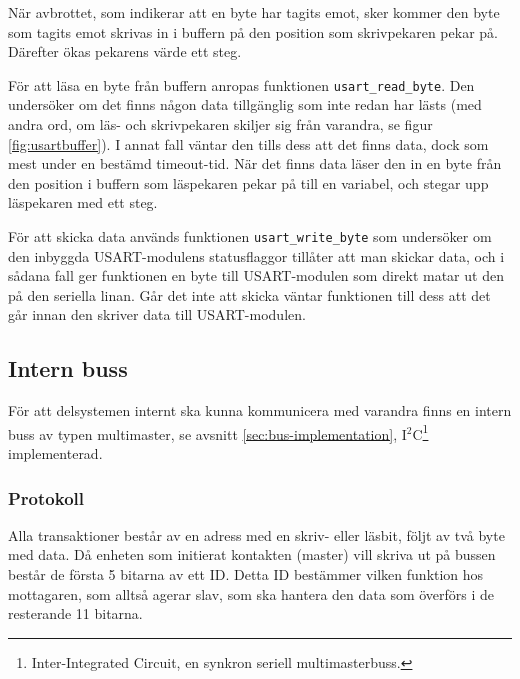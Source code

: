 När avbrottet, som indikerar att en byte har tagits emot, sker kommer den byte som tagits emot skrivas in i buffern på den position som skrivpekaren pekar på. Därefter ökas pekarens värde ett steg.


För att läsa en byte från buffern anropas funktionen \verb|usart_read_byte|. Den undersöker om det finns någon data tillgänglig som inte redan har lästs (med andra ord, om läs- och skrivpekaren skiljer sig från varandra, se figur \ref{fig:usartbuffer}). I annat fall väntar den tills dess att det finns data, dock som mest under en bestämd timeout-tid. När det finns data läser den in en byte från den position i buffern som läspekaren pekar på till en variabel, och stegar upp läspekaren med ett steg.

För att skicka data används funktionen \verb|usart_write_byte| som undersöker om den inbyggda USART-modulens statusflaggor tillåter att man skickar data, och i sådana fall ger funktionen en byte till USART-modulen som direkt matar ut den på den seriella linan. Går det inte att skicka väntar funktionen till dess att det går innan den skriver data till USART-modulen.

\subsection{Intern buss}
\label{sec:bus}

För att delsystemen internt ska kunna kommunicera med varandra finns en intern buss av typen multimaster, se avsnitt \ref{sec:bus-implementation}, I$^2$C\footnote{Inter-Integrated Circuit, en synkron seriell multimasterbuss.\cite{i2c}} implementerad.

\subsubsection{Protokoll}
\label{sec:bus-protokoll}
Alla transaktioner består av en adress med en skriv- eller läsbit, följt av två byte med data. Då enheten som initierat kontakten (master) vill skriva ut på bussen består de första 5 bitarna av ett ID. Detta ID bestämmer vilken funktion hos mottagaren, som alltså agerar slav, som ska hantera den data som överförs i de resterande 11 bitarna.


